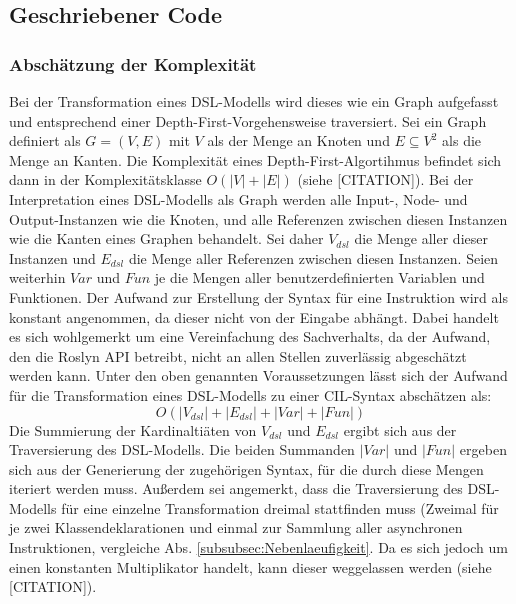\subsection{Geschriebener Code}

\subsubsection{Abschätzung der Komplexität}
Bei der Transformation eines DSL-Modells wird dieses wie ein Graph aufgefasst und entsprechend einer Depth-First-Vorgehensweise traversiert. Sei ein Graph definiert als $G = (V, E)$ mit $V$ als der Menge an Knoten und $E \subseteq V^{2}$ als die Menge an Kanten. Die Komplexität eines Depth-First-Algortihmus befindet sich dann in der Komplexitätsklasse $O(\left\vert{V}\right\vert + \left\vert{E}\right\vert)$ (siehe [CITATION]). Bei der Interpretation eines DSL-Modells als Graph werden alle Input-, Node- und Output-Instanzen wie die Knoten, und alle Referenzen zwischen diesen Instanzen wie die Kanten eines Graphen behandelt. Sei daher $V_{dsl}$ die Menge aller dieser Instanzen und $E_{dsl}$ die Menge aller Referenzen zwischen diesen Instanzen. Seien weiterhin $Var$ und $Fun$  je die Mengen aller benutzerdefinierten Variablen und Funktionen. Der Aufwand zur Erstellung der Syntax für eine Instruktion wird als konstant angenommen, da dieser nicht von der Eingabe abhängt. Dabei handelt es sich wohlgemerkt um eine Vereinfachung des Sachverhalts, da der Aufwand, den die Roslyn API betreibt, nicht an allen Stellen zuverlässig abgeschätzt werden kann. 
\newline
Unter den oben genannten Voraussetzungen lässt sich der Aufwand für die Transformation eines DSL-Modells zu einer CIL-Syntax abschätzen als:
$$ O( \left\vert{V_{dsl}}\right\vert + \left\vert{E_{dsl}}\right\vert + \left\vert{Var}\right\vert + \left\vert{Fun}\right\vert ) $$
Die Summierung der Kardinaltiäten von $V_{dsl}$ und $E_{dsl}$ ergibt sich aus der Traversierung des DSL-Modells. Die beiden Summanden $\left\vert{Var}\right\vert$ und $\left\vert{Fun}\right\vert$ ergeben sich aus der Generierung der zugehörigen Syntax, für die durch diese Mengen iteriert werden muss. Außerdem sei angemerkt, dass die Traversierung des DSL-Modells für eine einzelne Transformation dreimal stattfinden muss (Zweimal für je zwei Klassendeklarationen und einmal zur Sammlung aller asynchronen Instruktionen, vergleiche Abs. \ref{subsubsec:Nebenlaeufigkeit}. Da es sich jedoch um einen konstanten Multiplikator handelt, kann dieser weggelassen werden (siehe [CITATION]). 